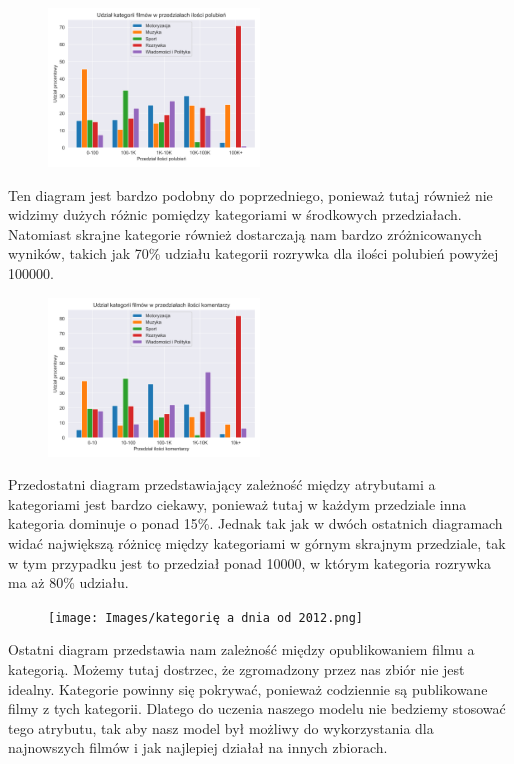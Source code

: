 \begin{figure}[H]
    \centering
    \includegraphics[width=0.5\textwidth]{Images/Zależność polubień od kategorią.png}
    \label{fig:likes_count}
\end{figure}
Ten diagram jest bardzo podobny do poprzedniego, ponieważ tutaj również nie widzimy dużych różnic pomiędzy kategoriami w środkowych przedziałach. Natomiast skrajne kategorie również dostarczają nam bardzo zróżnicowanych wyników, takich jak 70\% udziału kategorii rozrywka dla ilości polubień powyżej 100000.

\begin{figure}[H]
    \centering
    \includegraphics[width=0.5\textwidth]{Images/Zależność komentarzy od kategorią.png}
    \label{fig:coments_count}
\end{figure}
Przedostatni diagram przedstawiający zależność między atrybutami a kategoriami jest bardzo ciekawy, ponieważ tutaj w każdym przedziale inna kategoria dominuje o ponad 15\%. Jednak tak jak w dwóch ostatnich diagramach widać największą różnicę między kategoriami w górnym skrajnym przedziale, tak w tym przypadku jest to przedział ponad 10000, w którym kategoria rozrywka ma aż 80\% udziału.

\begin{figure}[H]
    \centering
    \texttt{[image: Images/kategorię a dnia od 2012.png]}
    \label{fig:add_days}
\end{figure}
Ostatni diagram przedstawia nam zależność między opublikowaniem filmu a kategorią. Możemy tutaj dostrzec, że zgromadzony przez nas zbiór nie jest idealny. Kategorie powinny się pokrywać, ponieważ codziennie są publikowane filmy z tych kategorii. Dlatego do uczenia naszego modelu nie bedziemy stosować tego atrybutu, tak aby nasz model był możliwy do wykorzystania dla najnowszych filmów i jak najlepiej działał na innych zbiorach.


